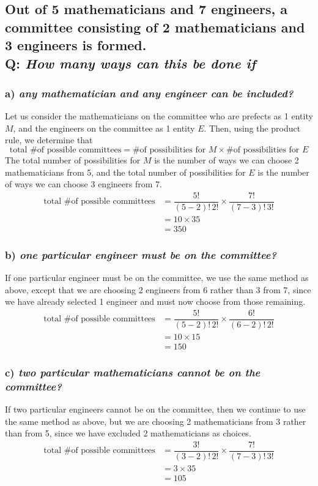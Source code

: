 \documentclass{article}
\begin{document}
\subsection*{{\normalsize Out of 5 mathematicians and 7 engineers, a committee consisting of 2 mathematicians and 3 engineers is formed.}\\
Q: {\em How many ways can this be done if}}
\subsubsection*{a) {\em any mathematician and any engineer can be included?}}
Let us consider the mathematicians on the committee who are prefects as 1 entity $M$, and the engineers on the committee as 1 entity $E$. Then, using the product rule, we determine that
\begin{equation*}
\text{total \# of possible committees}=\text{\# of possibilities for }M\times \text{\# of possibilities for }E
\end{equation*}
The total number of possibilities for $M$ is the number of ways we can choose 2 mathematicians from 5, and the total number of possibilities for $E$ is the number of ways we can choose 3 engineers from 7.
\begin{align*}
\text{total \# of possible committees}& =\dfrac{5!}{(5-2)!\,2!}\times\dfrac{7!}{(7-3)!\,3!}\\
& =10\times 35\\
& =350
\end{align*}

\subsubsection*{b) {\em one particular engineer must be on the committee?}}
If one particular engineer must be on the committee, we use the same method as above, except that we are choosing 2 engineers from 6 rather than 3 from 7, since we have already selected 1 engineer and must now choose from those remaining.
\begin{align*}
\text{total \# of possible committees}& =\dfrac{5!}{(5-2)!\,2!}\times\dfrac{6!}{(6-2)!\,2!}\\
& =10\times 15\\
& =150
\end{align*}

\subsubsection*{c) {\em two particular mathematicians cannot be on the committee?}}
If two particular engineers cannot be on the committee, then we continue to use the same method as above, but we are choosing 2 mathematicians from 3 rather than from 5, since we have excluded 2 mathematicians as choices.
\begin{align*}
\text{total \# of possible committees}& =\dfrac{3!}{(3-2)!\,2!}\times\dfrac{7!}{(7-3)!\,3!}\\
& =3\times 35\\
& =105
\end{align*}
\end{document}
